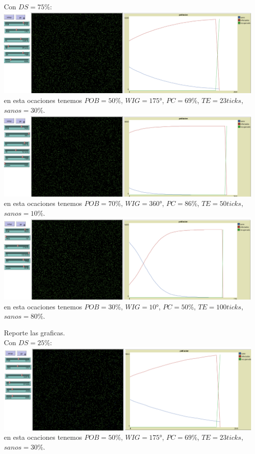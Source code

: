 \documentclass[12pt]{article}
\begin{document}
\begin{enumerate}
\begin{enumerate}
        
        Con $DS=75\%$:\\

        \textbf{\includegraphics[scale = 0.30]{images/30-75.png}}\\
        en esta ocaciones tenemos $POB=50\%$, $WIG=175$°, $PC=69\%$, $TE=23ticks$, $sanos=30\%$.\\
        
        \textbf{\includegraphics[scale = 0.30]{images/31-50.png}}\\
        en esta ocaciones tenemos $POB=70\%$, $WIG=360$°, $PC=86\%$, $TE=50ticks$, $sanos=10\%$.\\
    

        \textbf{\includegraphics[scale = 0.30]{images/32-75.png}}\\
        en esta ocaciones tenemos $POB=30\%$, $WIG=10$°, $PC=50\%$, $TE=100ticks$, $sanos=80\%$.\\


\end{enumerate}
    Reporte las graficas.\\
    Con $DS=25\%$:\\

    \textbf{\includegraphics[scale = 0.30]{images/30-25.png}}\\
    en esta ocaciones tenemos $POB=50\%$, $WIG=175$°, $PC=69\%$, $TE=23ticks$, $sanos=30\%$.\\



\end{enumerate}
\end{document}
